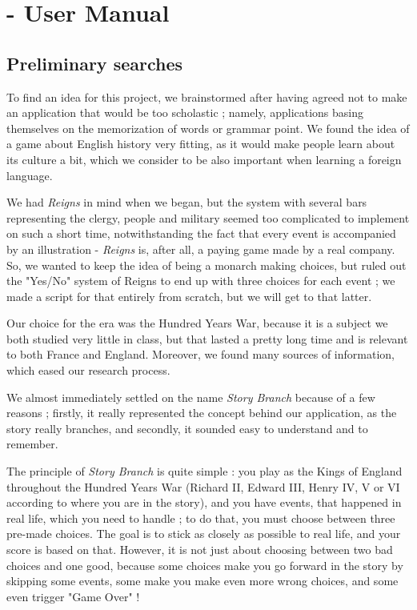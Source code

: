 \documentclass{scrreprt}
\begin{document}
{\let\clearpage\relax \chapter{- User Manual}}

\section{Preliminary searches}

To find an idea for this project, we brainstormed after having agreed not to make an application that would be too scholastic ; namely, applications basing themselves on the memorization of words or grammar point. We found the idea of a game about English history very fitting, as it would make people learn about its culture a bit, which we consider to be also important when learning a foreign language. 

We had \textit{Reigns} in mind when we began, but the system with several bars representing the clergy, people and military seemed too complicated to implement on such a short time, notwithstanding the fact that every event is accompanied by an illustration - \textit{Reigns} is, after all, a paying game made by a real company. So, we wanted to keep the idea of being a monarch making choices, but ruled out the "Yes/No" system of Reigns to end up with three choices for each event ; we made a script for that entirely from scratch, but we will get to that latter.

Our choice for the era was the Hundred Years War, because it is a subject we both studied very little in class, but that lasted a pretty long time and is relevant to both France and England. Moreover, we found many sources of information, which eased our research process.

We almost immediately settled on the name \textit{Story Branch} because of a few reasons ; firstly, it really represented the concept behind our application, as the story really branches, and secondly, it sounded easy to understand and to remember.

The principle of \textit{Story Branch} is quite simple : you play as the Kings of England throughout the Hundred Years War (Richard II, Edward III, Henry IV, V or VI according to where you are in the story), and you have events, that happened in real life, which you need to handle ; to do that, you must choose between three pre-made choices. The goal is to stick as closely as possible to real life, and your score is based on that. However, it is not just about choosing between two bad choices and one good, because some choices make you go forward in the story by skipping some events, some make you make even more wrong choices, and some even trigger "Game Over" !
\end{document}
